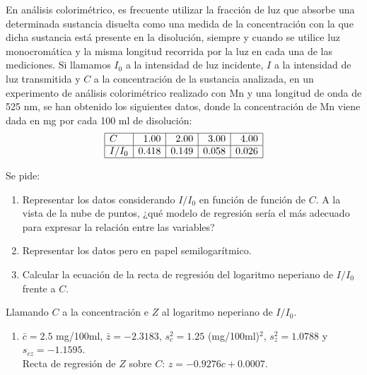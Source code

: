 {En análisis colorimétrico, es frecuente utilizar la fracción de luz que absorbe una determinada sustancia disuelta
como una medida de la concentración con la que dicha sustancia está presente en la disolución, siempre y cuando se
utilice luz monocromática y la misma longitud recorrida por la luz en cada una de las mediciones.
Si llamamos $I_0$ a la intensidad de luz incidente, $I$ a la intensidad de luz transmitida y $C$ a la concentración de
la sustancia analizada, en un experimento de análisis colorimétrico realizado con Mn y una longitud de onda de 525 nm,
se han obtenido los siguientes datos, donde la concentración de Mn viene dada en mg por cada 100 ml de disolución:
\[
\begin{array}{|l|r|r|r|r|}
\hline
C & 1.00 & 2.00 & 3.00 & 4.00\\
\hline
I/I_0 & 0.418 & 0.149 & 0.058 & 0.026\\
\hline
\end{array}
\]

Se pide:
\begin{enumerate}
\item Representar los datos considerando $I/I_0$ en función de función de $C$.
A la vista de la nube de puntos, ¿qué modelo de regresión sería el más adecuado para expresar la relación entre las
variables?
\item Representar los datos pero en papel semilogarítmico.
\item Calcular la ecuación de la recta de regresión del logaritmo neperiano de $I/I_0$ frente a $C$.
\end{enumerate}
}
{Llamando $C$ a la concentración e $Z$ al logaritmo neperiano de $I/I_0$.
\begin{enumerate}[start=3]
\item $\bar c=2.5$ mg/100ml, $\bar z=-2.3183$, $s_c^2=1.25$ (mg/100ml)$^2$, $s_z^2=1.0788$ y $s_{cz}=-1.1595$.\\
Recta de regresión de $Z$ sobre $C$: $z=-0.9276c+0.0007$.
\end{enumerate}
}
{}


